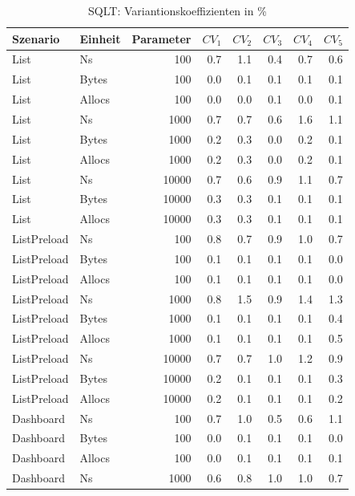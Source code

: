 
\begin{table}[ht]
\setlength{\extrarowheight}{-1pt}
\centering
\caption{SQLT: Variantionskoeffizienten in \%}
\begin{tabular}{llrrrrrr}
\toprule
Szenario & Einheit & Parameter & ${CV_1}$ & ${CV_2}$ & ${CV_3}$& ${CV_4}$ & ${CV_5}$ \\
\midrule
	List & Ns & 100 &  0.7 &  1.1 &  0.4 &  0.7 &  0.6 \\
	List & Bytes & 100 &  0.0 &  0.1 &  0.1 &  0.1 &  0.1 \\
	List & Allocs & 100 &  0.0 &  0.0 &  0.1 &  0.0 &  0.1 \\
	List & Ns & 1000 &  0.7 &  0.7 &  0.6 &  1.6 &  1.1 \\
	List & Bytes & 1000 &  0.2 &  0.3 &  0.0 &  0.2 &  0.1 \\
	List & Allocs & 1000 &  0.2 &  0.3 &  0.0 &  0.2 &  0.1 \\
	List & Ns & 10000 &  0.7 &  0.6 &  0.9 &  1.1 &  0.7 \\
	List & Bytes & 10000 &  0.3 &  0.3 &  0.1 &  0.1 &  0.1 \\
	List & Allocs & 10000 &  0.3 &  0.3 &  0.1 &  0.1 &  0.1 \\
	ListPreload & Ns & 100 &  0.8 &  0.7 &  0.9 &  1.0 &  0.7 \\
	ListPreload & Bytes & 100 &  0.1 &  0.1 &  0.1 &  0.1 &  0.0 \\
	ListPreload & Allocs & 100 &  0.1 &  0.1 &  0.1 &  0.1 &  0.0 \\
	ListPreload & Ns & 1000 &  0.8 &  1.5 &  0.9 &  1.4 &  1.3 \\
	ListPreload & Bytes & 1000 &  0.1 &  0.1 &  0.1 &  0.1 &  0.4 \\
	ListPreload & Allocs & 1000 &  0.1 &  0.1 &  0.1 &  0.1 &  0.5 \\
	ListPreload & Ns & 10000 &  0.7 &  0.7 &  1.0 &  1.2 &  0.9 \\
	ListPreload & Bytes & 10000 &  0.2 &  0.1 &  0.1 &  0.1 &  0.3 \\
	ListPreload & Allocs & 10000 &  0.2 &  0.1 &  0.1 &  0.1 &  0.2 \\
	Dashboard & Ns & 100 &  0.7 &  1.0 &  0.5 &  0.6 &  1.1 \\
	Dashboard & Bytes & 100 &  0.0 &  0.1 &  0.1 &  0.1 &  0.0 \\
	Dashboard & Allocs & 100 &  0.0 &  0.1 &  0.1 &  0.1 &  0.1 \\
	Dashboard & Ns & 1000 &  0.6 &  0.8 &  1.0 &  1.0 &  0.7 \\

\end{tabular}
\end{table}
